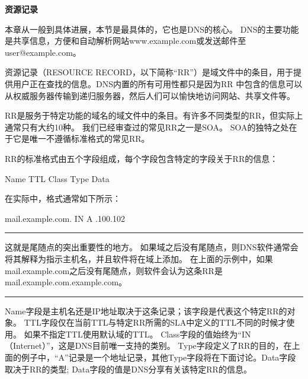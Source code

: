 ﻿\documentclass[english,runningheads,a4paper]{llncs}[2018/03/10]
\begin{document}
\par\noindent\textbf{资源记录}

\par\noindent 本章从一般到具体进展，本节是最具体的，它也是DNS的核心。 DNS的主要功能是共享信息，方便和自动解析网站www.example.com或发送邮件至user@example.com。

\par\setlength\parindent{2em}资源记录（RESOURCE RECORD，以下简称“RR”）是域文件中的条目，用于提供用户正在查找的信息。DNS内置的所有可用性都只是因为RR 中包含的信息可以从权威服务器传输到递归服务器，然后人们可以愉快地访问网站、共享文件等。

\par\setlength\parindent{2em}RR是服务于特定功能的域名的域文件中的条目。有许多不同类型的RR，但实际上通常只有大约10种。 我们已经审查过的常见RR之一是SOA。 SOA的独特之处在于它是唯一不遵循标准格式的常见RR。

\par\setlength\parindent{2em}RR的标准格式由五个字段组成，每个字段包含特定的字段关于RR的信息：

\par\setlength\parindent{2em}Name \qquad TTL \qquad Class \qquad Type \qquad Data

\par\setlength\parindent{2em} 在实际中，格式通常如下所示：

\par\setlength\parindent{2em} mail.example.com.  \qquad IN \qquad A .100.102

\par\noindent\rule[0.25\baselineskip]{\textwidth}{1pt} %

\begin{adjustwidth}{2em}{2em}
\qquad 这就是尾随点的突出重要性的地方。 如果域之后没有尾随点，则DNS软件通常会将其解释为指示主机名，并且软件将在域上添加。 在上面的示例中，如果mail.example.com之后没有尾随点，则软件会认为这条RR是mail.example.com.example.com。
\end{adjustwidth}

\par\noindent\rule[0.25\baselineskip]{\textwidth}{1pt} %

\par\setlength\parindent{2em} Name字段是主机名还是IP地址取决于这条记录；该字段是代表这个特定RR的对象。 TTL字段仅在当前TTL与特定RR所需的SLA中定义的TTL不同的时候才使用。 如果不指定TTL使用默认域的TTL。 Class字段的值始终为“IN（Internet）”，这是DNS目前唯一支持的类别。 Type字段定义了RR的目的，在上面的例子中，“A”记录是一个地址记录，其他Type字段将在下面讨论。Data字段取决于RR的类型; Data字段的值是DNS分享有关该特定RR的信息。
\end{document}
